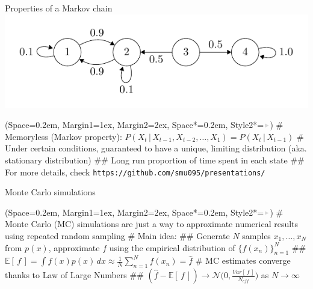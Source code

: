 \documentclass[12pt, aspectratio=149]{beamer}
\newcommand{\listSpace}{0.2em}
\theoremstyle{plain}
\begin{document}
\begin{frame}[fragile]{Properties of a Markov chain}
	\includegraphics[scale=.8]{figs/irreducible.pdf}
	\begin{easylist}
		\ListProperties(Space=\listSpace, Margin1=1ex, Margin2=2ex, Space*=\listSpace, Style2*=$\color{bggraydark}\blacktriangleright$\space)
		# Memoryless (Markov property): $P(X_t\,|\,X_{t-1}, X_{t-2}, \ldots, X_1) = P(X_t\,|\,X_{t-1})$
		# Under certain conditions, guaranteed to have a unique, limiting distribution (aka. stationary distribution)
		## Long run proportion of time spent in each state
		## For more details, check \footnotesize\texttt{https://github.com/smu095/presentations/}
	\end{easylist}
\end{frame}

\begin{frame}[fragile]{Monte Carlo simulations}
	\begin{easylist}
		\ListProperties(Space=\listSpace, Margin1=1ex, Margin2=2ex, Space*=\listSpace, Style2*=$\color{bggraydark}\blacktriangleright$\space)
		# Monte Carlo (MC) simulations are just a way to approximate numerical results using repeated random sampling
		# Main idea:
		## Generate $N$ samples $x_1, \ldots, x_N$ from $p(x)$, approximate $f$ using the empirical distribution of $\{f(x_n)\}_{n=1}^N$
		## $\mathbb{E}\left[ \, f \, \right] = \int f(x)p(x) \,dx \approx \frac{1}{N} \sum_{n=1}^{N} f(x_n) = \hat{f}$ 
		# MC estimates converge thanks to Law of Large Numbers
		## $(\hat{f} - \mathbb{E}\left[ \, f \, \right]) \rightarrow \mathcal{N}\Big(0, \frac{Var\left[\,f\,\right]}{N_{eff}}\Big)$ as $N \rightarrow \infty$
	\end{easylist}
\end{frame}
\end{document}
